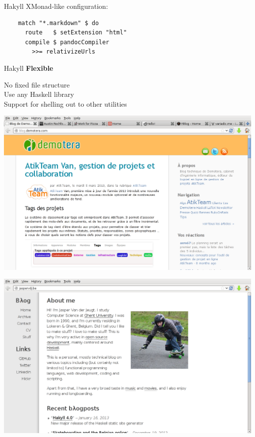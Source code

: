 \documentclass[20pt]{beamer}
\newcommand{\vspaced}{
    \vspace{5mm}
}
\begin{document}
\begin{frame}[fragile]{Hakyll}
    XMonad-like configuration: \\
    \vspaced
    \begin{lstlisting}
    match "*.markdown" $ do
      route   $ setExtension "html"
      compile $ pandocCompiler
        >>= relativizeUrls
    \end{lstlisting}
\end{frame}

\begin{frame}{Hakyll}
    \textbf{Flexible} \\
    \vspaced
    No fixed file structure \\
    Use any Haskell library \\
    Support for shelling out to other utilities \\
\end{frame}

\begin{frame}[plain]
    \includegraphics[width=\textwidth]{images/example-demotera.png}
\end{frame}

\begin{frame}[plain]
    \includegraphics[width=\textwidth]{images/example-jaspervdj.png}
\end{frame}
\end{document}

